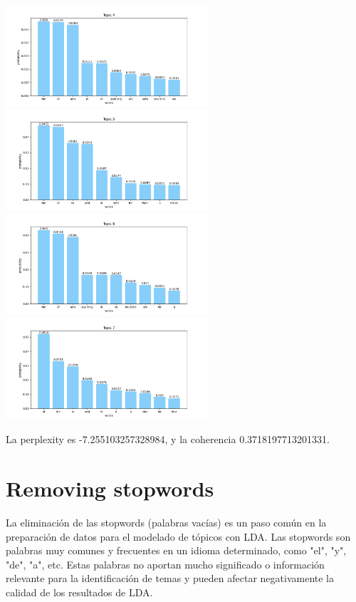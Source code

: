 \documentclass[10pt]{article} %
\begin{document}
\begin{center}
		\includegraphics[width=7.5cm]{images/plots/test_8/topic_4.png}
		\includegraphics[width=7.5cm]{images/plots/test_8/topic_5.png}
		\includegraphics[width=7.5cm]{images/plots/test_8/topic_6.png}
		\includegraphics[width=7.5cm]{images/plots/test_8/topic_7.png}
	\end{center}

	La perplexity es -7.255103257328984, y la coherencia  0.3718197713201331.
	
	
	\section{Removing stopwords}
	
	La eliminación de las stopwords (palabras vacías) es un paso común en la preparación de datos para el modelado de tópicos con LDA. Las stopwords son palabras muy comunes y frecuentes en un idioma determinado, como "el", "y", "de", "a", etc. Estas palabras no aportan mucho significado o información relevante para la identificación de temas y pueden afectar negativamente la calidad de los resultados de LDA.
	
\end{document}
